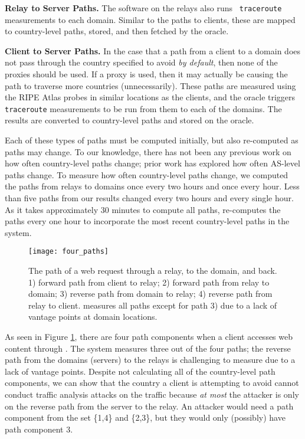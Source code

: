{\bf Relay to Server Paths.} The software on the relays also runs {\tt 
traceroute} measurements to each domain.  Similar to the paths to clients, these 
are mapped to country-level paths, stored, and then fetched by the oracle.

{\bf Client to Server Paths.} In the case that a path from a client to a 
domain does not pass through the country specified to avoid {\it by default}, 
then none of the proxies should be used.  If a proxy is used, then it may 
actually be causing the path to traverse more countries (unnecessarily).  These 
paths are measured using the RIPE Atlas probes in similar locations as the 
clients, and the oracle triggers {\tt traceroute} measurements to be run from 
them to each of the domains.  The results are converted to country-level paths 
and stored on the oracle.  

Each of these types of paths must be computed initially, but also re-computed 
as paths may change.  To our knowledge, there has not been any previous work 
on how often country-level paths change; prior work has explored how often 
AS-level paths change.  To measure how often country-level paths change, we 
computed the paths from relays to domains once every two hours and once every 
hour.  Less than five paths from our results changed every two hours and every 
single hour. As it takes approximately 30 minutes to 
compute all paths, \system{} re-computes the paths every one hour to incorporate 
the most recent country-level paths in the system.

\begin{figure}[t]
\centering
\texttt{[image: four\_paths]}
\caption{The path of a web request through a \system{} relay, to the domain, and back. 
1) forward path from client to relay; 2) forward path from relay to domain; 3) reverse 
path from domain to relay; 4) reverse path from relay to client.  \system{} measures 
all paths except for path 3) due to a lack of vantage points at domain locations.}
\label{fig:path_components}
\end{figure}

As seen in Figure \ref{fig:path_components}, there are four path components 
when a client accesses web content through \system{}.  The system measures three 
out of the four paths; the reverse path from the domains (servers) to the relays 
is challenging to measure due to a lack of vantage points.  Despite not 
calculating all of the country-level path components, we can show that the 
country a client is attempting to avoid cannot conduct traffic analysis attacks 
on the traffic because {\it at most} the attacker is only on the reverse path 
from the server to the relay.  An attacker would need a path component from the 
set \{1,4\} and \{2,3\}, but they would only (possibly) have path component 3.

